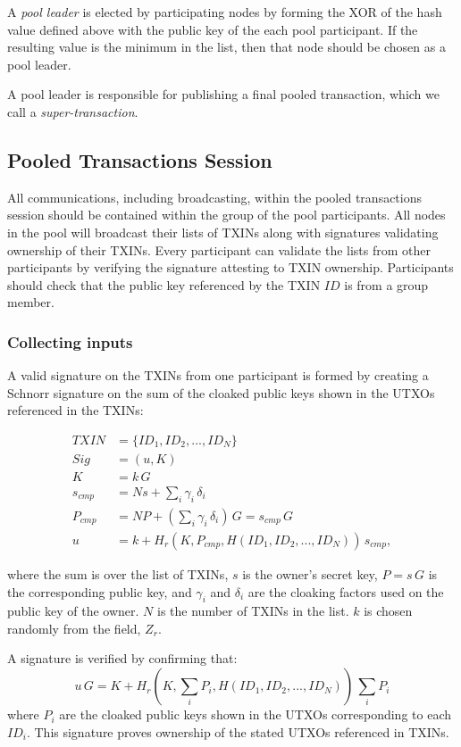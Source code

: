 \documentclass[a4paper, 10pt, conference]{ieeeconf}
\begin{document}
A \textit{pool leader} is elected by participating nodes by forming the XOR of the hash value defined above with the public key of the each pool participant. If the resulting value is the minimum in the list, then that node should be chosen as a pool leader.

A pool leader is responsible for publishing a final pooled transaction, which we call a \textit{super-transaction}.

\subsection{Pooled Transactions Session}

All communications, including broadcasting, within the pooled transactions session should be contained within the group of the pool participants. All nodes in the pool will broadcast their lists of TXINs along with signatures validating ownership of their TXINs. Every participant can validate the lists from other participants by verifying the signature attesting to TXIN ownership. Participants should check that the public key referenced by the TXIN $ID$ is from a group member.

\subsubsection{Collecting inputs} A valid signature on the TXINs from one participant is formed by creating a Schnorr signature on the sum of the cloaked public keys shown in the UTXOs referenced in the TXINs:

\begin{align*}
TXIN &= \{ID_1, ID_2, ..., ID_N\}\\
Sig &= (u, K)\\
K &= k \, G \\
s_{cmp} &= N s + \sum_i{\gamma_i \, \delta_i}\\
P_{cmp} &= N P + (\sum_i{\gamma_i \, \delta_i})\, G = s_{cmp} \, G\\
u &= k + H_r(K, P_{cmp}, H(ID_1, ID_2, ..., ID_N)) \, s_{cmp},
\end{align*}

where the sum is over the list of TXINs, $s$ is the owner's secret key, $P = s \, G$ is the corresponding public key, and $\gamma_i$ and $\delta_i$ are the cloaking factors used on the public key of the owner. $N$ is the number of TXINs in the list. $k$ is chosen randomly from the field, $Z_r$. 

A signature is verified by confirming that:
$$u \, G = K + H_r(K, \sum_i{P_i}, H(ID_1, ID_2, ..., ID_N)) \, \sum_i{P_i}$$
where $P_i$ are the cloaked public keys shown in the UTXOs corresponding to each $ID_i$. This signature proves ownership of the stated UTXOs referenced in TXINs.
\end{document}
